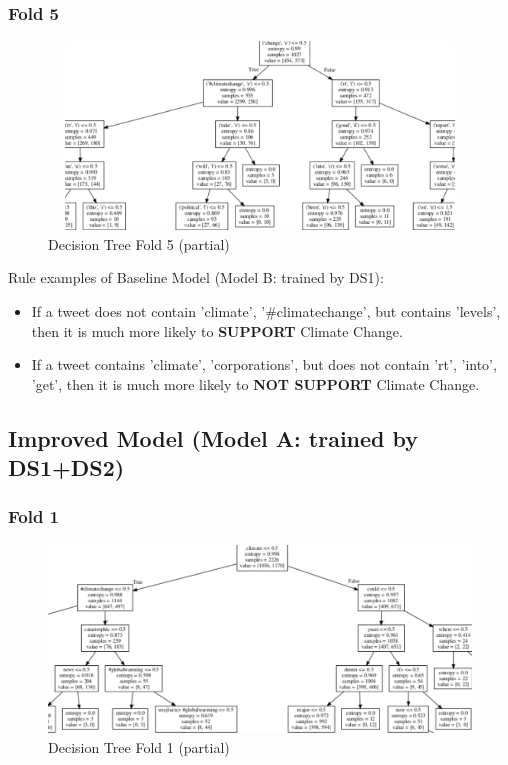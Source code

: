 \documentclass{article} %
\begin{document}
\subsubsection{Fold 5}

\begin{figure}[H]
	\includegraphics[height=5cm, width=17cm]{10.png}
	\caption{Decision Tree Fold 5 (partial)}
\end{figure}


Rule examples of Baseline Model (Model B: trained by DS1): 
\begin{itemize}
	\item  If a tweet does not contain 'climate', '\#climatechange', but contains 'levels', then it is much more likely to \textbf{SUPPORT} Climate Change.
	\item  If a tweet contains 'climate', 'corporations', but does not contain 'rt', 'into', 'get',  then it is much more likely to \textbf{NOT SUPPORT} Climate Change.
\end{itemize}


\subsection{Improved Model (Model A: trained by DS1+DS2)}


\label{token:word}
\subsubsection{Fold 1}

\begin{figure}[H]
	\includegraphics[height=5cm, width=17cm]{11.png}
	\caption{Decision Tree Fold 1 (partial)}
\end{figure}
\end{document}
